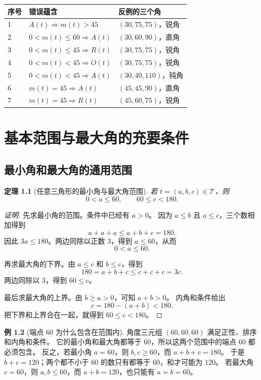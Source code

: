 \documentclass[UTF8,a4paper,zihao=-4,oneside,openany,fontset=fandol]{ctexbook}
\newtheorem{theorem}{定理}[chapter]
\theoremstyle{definition}
\newtheorem{example}[theorem]{例}
\theoremstyle{remark}
\begin{document}
\begin{center}
\begin{tabular}{|p{}|p{}|p{}|}
\hline
序号 & 错误蕴含 & 反例的三个角\\
\hline
1 & $A(t)\Longrightarrow m(t)>45$ & $(30,75,75)$，锐角\\
\hline
2 & $0<m(t)\le60\Longrightarrow A(t)$ & $(30,60,90)$，直角\\
\hline
3 & $0<m(t)\le45\Longrightarrow R(t)$ & $(30,75,75)$，锐角\\
\hline
4 & $0<m(t)<45\Longrightarrow O(t)$ & $(30,75,75)$，锐角\\
\hline
5 & $0<m(t)<45\Longrightarrow A(t)$ & $(30,40,110)$，钝角\\
\hline
6 & $m(t)=45\Longrightarrow A(t)$ & $(45,45,90)$，直角\\
\hline
7 & $m(t)=45\Longrightarrow R(t)$ & $(45,60,75)$，锐角\\
\hline
\end{tabular}
\end{center}

\chapter{基本范围与最大角的充要条件}
\label{math:maximum}

\section{最小角和最大角的通用范围}

\begin{theorem}[任意三角形的最小角与最大角范围]
若 $t=(a,b,c)\in\mathcal T$，则
\[
0<a\le60,\qquad60\le c<180.
\]
\end{theorem}

\begin{proof}[证明]
先求最小角的范围。条件中已经有 $a>0$。
因为 $a\le b$ 且 $a\le c$，三个数相加得到
\[
a+a+a\le a+b+c=180.
\]
因此 $3a\le180$。两边同除以正数 $3$，得到 $a\le60$，从而
\[
0<a\le60.
\]

再求最大角的下界。由 $a\le c$ 和 $b\le c$，得到
\[
180=a+b+c\le c+c+c=3c.
\]
两边同除以 $3$，得到 $60\le c$。

最后求最大角的上界。由 $b\ge a>0$，可知 $a+b>0$。
内角和条件给出
\[
c=180-(a+b)<180.
\]
把下界和上界合在一起，就得到 $60\le c<180$。
\end{proof}

\begin{example}[端点 $60$ 为什么包含在范围内]
角度三元组 $(60,60,60)$ 满足正性、排序和内角和条件。
它的最小角和最大角都等于 $60$，所以这两个范围中的端点 $60$ 都必须包含。
反之，若最小角 $a=60$，则 $b,c\ge60$，而 $a+b+c=180$。
于是 $b+c=120$；两个都不小于 $60$ 的数只有都等于 $60$，和才可能为 $120$。
若最大角 $c=60$，则 $a,b\le60$，而 $a+b=120$，也只能有 $a=b=60$。
\end{example}
\end{document}
